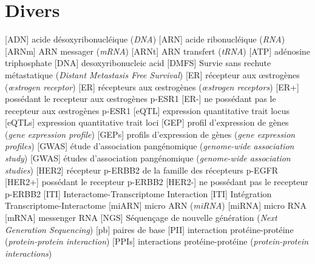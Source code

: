 	\section*{\textcolor{mygrey}{Divers}}
		\begin{acronym}[CDKN2A]
			   {acide désoxyribonucléique (\emph{\acs{DNA}})}
			   {acide ribonucléique (\emph{\acs{RNA}})}
			  {\acs{ARN} messager (\emph{\acs{mRNA}})}
			  {\acs{ARN} transfert (\emph{\acs{tRNA}})}
			   {adénosine triphosphate}
			   {desoxyribonucleic acid}
			  {Survie sans rechute métastatique (\emph{Distant Metastasis Free Survival})}
			    {récepteur aux {\oe}strogènes (\emph{{\oe}strogen receptor})}
			    {récepteurs aux {\oe}strogènes (\emph{{\oe}strogen receptors})}
			   {possédant le recepteur aux {\oe}strogènes \acs{p-ESR1}}
			   {ne possédant pas le recepteur aux {\oe}strogènes \acs{p-ESR1}}
			  {expression quantitative trait locus}
			 {expression quantitative trait loci}
			   {profil d'expression de gènes (\emph{gene expression profile})}
			  {profils d'expression de gènes (\emph{gene expression profiles})}
			  {étude d'association pangénomique (\emph{genome-wide association study})}
			  {études d'association pangénomique (\emph{genome-wide association studies})}
			  {récepteur \acs{p-ERBB2} de la famille des récepteurs \acs{p-EGFR}}
			 {possédant le recepteur \acs{p-ERBB2}}
			 {ne possédant pas le recepteur \acs{p-ERBB2}}
			   {Interactome-Transcriptome Interaction}
			   {Intégration Transcriptome-Interactome}
			 {micro \acs{ARN} (\emph{\ac{miRNA}})}
			 {micro \acs{RNA}}
			  {messenger \ac{RNA}}
			   {Séquençage de nouvelle génération (\emph{Next Generation Sequencing})}
			    {paires de base}
			   {interaction protéine-protéine (\emph{protein-protein interaction})}
			  {interactions protéine-protéine (\emph{protein-protein interactions})}

\end{acronym}
